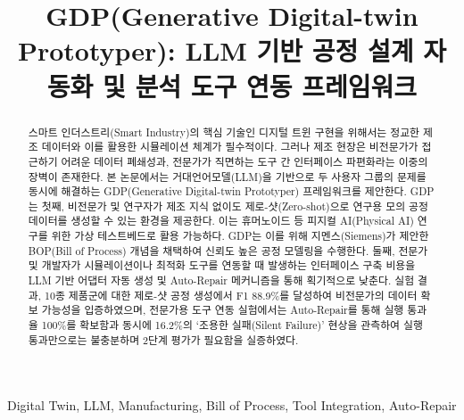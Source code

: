 \documentclass[conference]{IEEEtran}
\begin{document}
\title{GDP(Generative Digital-twin Prototyper): LLM 기반 공정 설계 자동화 및 분석 도구 연동 프레임워크}

\author{
\and
{}
}

\maketitle

\begin{abstract}
스마트 인더스트리(Smart Industry)의 핵심 기술인 디지털 트윈 구현을 위해서는 정교한 제조 데이터와 이를 활용한 시뮬레이션 체계가 필수적이다. 그러나 제조 현장은 비전문가가 접근하기 어려운 데이터 폐쇄성과, 전문가가 직면하는 도구 간 인터페이스 파편화라는 이중의 장벽이 존재한다. 본 논문에서는 거대언어모델(LLM)을 기반으로 두 사용자 그룹의 문제를 동시에 해결하는 GDP(Generative Digital-twin Prototyper) 프레임워크를 제안한다. GDP는 첫째, 비전문가 및 연구자가 제조 지식 없이도 제로-샷(Zero-shot)으로 연구용 모의 공정 데이터를 생성할 수 있는 환경을 제공한다. 이는 휴머노이드 등 피지컬 AI(Physical AI) 연구를 위한 가상 테스트베드로 활용 가능하다. GDP는 이를 위해 지멘스(Siemens)가 제안한 BOP(Bill of Process) 개념을 채택하여 신뢰도 높은 공정 모델링을 수행한다. 둘째, 전문가 및 개발자가 시뮬레이션이나 최적화 도구를 연동할 때 발생하는 인터페이스 구축 비용을 LLM 기반 어댑터 자동 생성 및 Auto-Repair 메커니즘을 통해 획기적으로 낮춘다. 실험 결과, 10종 제품군에 대한 제로-샷 공정 생성에서 F1 88.9\%를 달성하여 비전문가의 데이터 확보 가능성을 입증하였으며, 전문가용 도구 연동 실험에서는 Auto-Repair를 통해 실행 통과율 100\%를 확보함과 동시에 16.2\%의 `조용한 실패(Silent Failure)' 현상을 관측하여 실행 통과만으로는 불충분하며 2단계 평가가 필요함을 실증하였다.
\end{abstract}

\begin{IEEEkeywords}
Digital Twin, LLM, Manufacturing, Bill of Process, Tool Integration, Auto-Repair
\end{IEEEkeywords}

\end{document}
